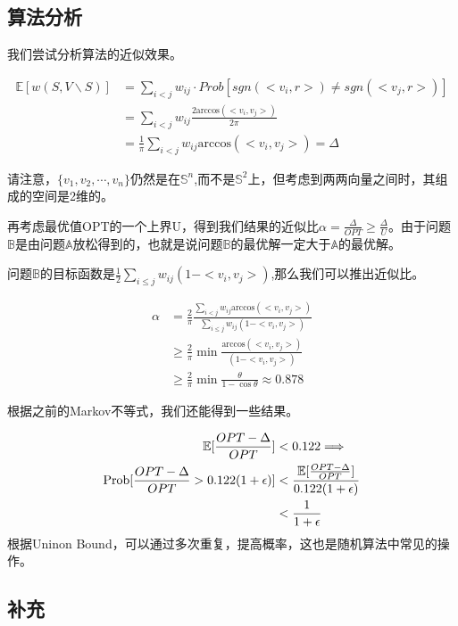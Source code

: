 \documentclass[lang=cn,newtx,10pt,scheme=chinese,chinesefont=nofont,citestyle=gb7714-2015, bibstyle=gb7714-2015]{elegantbook}
\begin{document}
\begin{refsection}
\subsection{算法分析}

我们尝试分析算法的近似效果。

\begin{align}
    \mathbb{E}[w(S,V\backslash S)]&=\sum_{i<j}w_{ij}\cdot Prob[sgn(<v_i,r>)\neq sgn(<v_j,r>)]\\
    &=\sum_{i<j}w_{ij}\frac{2\text{arccos}(<v_i,v_j>)}{2\pi}\\
    &=\frac{1}{\pi}\sum_{i<j}w_{ij}\text{arccos}(<v_i,v_j>)=\Delta
\end{align}
\begin{remark}
    请注意，$\{v_1,v_2,\cdots,v_n\}$仍然是在$\mathbb{S}^n$,而不是$\mathbb{S}^2$上，但考虑到两两向量之间时，其组成的空间是2维的。
\end{remark}
再考虑最优值OPT的一个上界U，得到我们结果的近似比$\alpha = \frac{\Delta}{OPT}\geq \frac{\Delta}{U}$。由于问题$\mathbb{B}$是由问题$\mathbb{A}$放松得到的，也就是说问题$\mathbb{B}$的最优解一定大于$\mathbb{A}$的最优解。

问题$\mathbb{B}$的目标函数是$\frac{1}{2}\sum_{i\le j}w_{ij}(1-<v_i,v_j>)$,那么我们可以推出近似比。

\begin{align}
    \alpha &= \frac{2}{\pi} \frac{\sum_{i<j}w_{ij}\text{arccos}(<v_i,v_j>)}{\sum_{i\le j}w_{ij}(1-<v_i,v_j>)}\\
    &\geq \frac{2}{\pi}\min \frac{\text{arccos}(<v_i,v_j>)}{(1-<v_i,v_j>)}\\
    &\geq \frac{2}{\pi} \min \frac{\theta}{1-\cos\theta}\approx 0.878
\end{align}

\noindent
根据之前的Markov不等式，我们还能得到一些结果。

\begin{align}
    \mathbb{E}[\frac{OPT-\Delta}{OPT}]&<0.122\Longrightarrow\notag\\
    \text{Prob}[\frac{OPT-\Delta}{OPT}> 0.122(1+\epsilon)]&<\frac{\mathbb{E}[\frac{OPT-\Delta}{OPT}]}{ 0.122(1+\epsilon)}\\
    &<\frac{1}{1+\epsilon}
\end{align}
根据Uninon Bound，可以通过多次重复，提高概率，这也是随机算法中常见的操作。

\subsection{补充}


\end{refsection}
\end{document}
